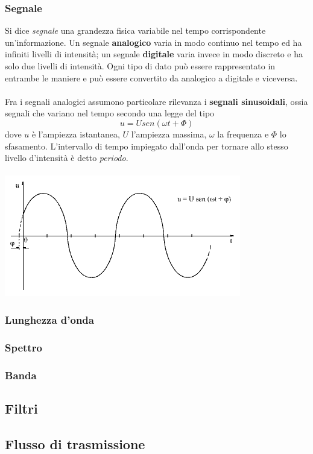 \documentclass[a4paper,11pt]{paper}
\begin{document}
\subsubsection{Segnale}
Si dice \textit{segnale} una grandezza fisica variabile nel tempo corrispondente un'informazione. Un segnale \textbf{analogico} varia in modo continuo nel tempo ed ha infiniti livelli di intensità; un segnale \textbf{digitale} varia invece in modo discreto e ha solo due livelli di intensità. Ogni tipo di dato può essere rappresentato in entrambe le maniere e può essere convertito da analogico a digitale e viceversa.
\\\\Fra i segnali analogici assumono particolare rilevanza i \textbf{segnali sinusoidali}, ossia segnali che variano nel tempo secondo una legge del tipo \[u=Usen(\omega t+\Phi )\] dove $u$ è l'ampiezza istantanea, $U$ l'ampiezza massima, $\omega $ la frequenza e $\Phi $ lo sfasamento. L'intervallo di tempo impiegato dall'onda per tornare allo stesso livello d'intensità è detto \textit{periodo}.\\\\
\includegraphics[scale=0.5]{segnali_sin.png}
\subsubsection{Lunghezza d'onda}
\subsubsection{Spettro}
\subsubsection{Banda}
\subsection{Filtri}

\subsection{Flusso di trasmissione}
\end{document}
